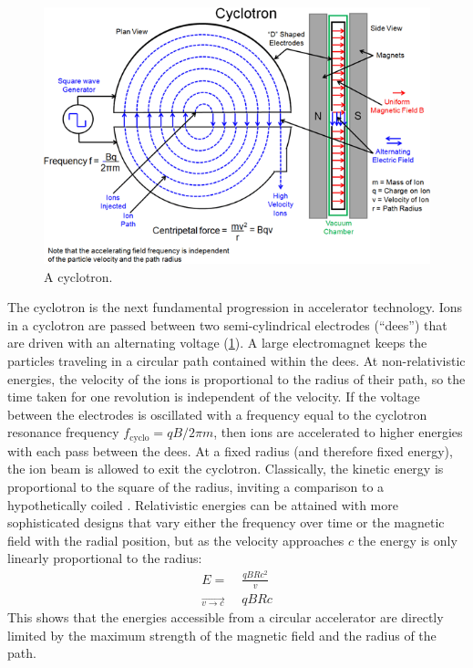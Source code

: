 \begin{figure}[t]
  \includegraphics{cyclotron.png}
  \caption{A cyclotron.}
  \label{fig:cyclotron}
\end{figure}
The cyclotron is the next fundamental progression in accelerator technology.
Ions in a cyclotron are passed between two semi-cylindrical electrodes (``dees'') that are driven with an alternating voltage (\cref{fig:cyclotron}).
A large electromagnet keeps the particles traveling in a circular path contained within the dees.
At non-relativistic energies, the velocity of the ions is proportional to the radius of their path, so the time taken for one revolution is independent of the velocity.
If the voltage between the electrodes is oscillated with a frequency equal to the cyclotron resonance frequency $f_\textrm{cyclo} = q B / 2\pi m$, then ions are accelerated to higher energies with each pass between the dees.
At a fixed radius (and therefore fixed energy), the ion beam is allowed to exit the cyclotron.
Classically, the kinetic energy is proportional to the square of the radius, inviting a comparison to a hypothetically coiled \linac.
Relativistic energies can be attained with more sophisticated designs that vary either the frequency over time or the magnetic field with the radial position, but as the velocity approaches $c$ the energy is only linearly proportional to the radius:
\begin{align}
\label{eq:gyroradius}
E =& \; \frac{q B R c^2}{v}\\
\overrightarrow{{}_{v \rightarrow c}}& \; q B R c
\end{align}
This shows that the energies accessible from a circular accelerator are directly limited by the maximum strength of the magnetic field and the radius of the path.

